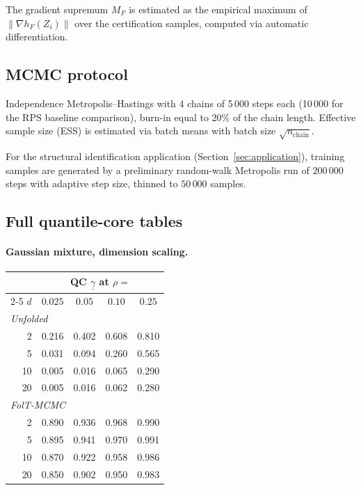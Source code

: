 The gradient supremum $M_F$ is estimated as the empirical maximum
of $\|\nabla h_F(Z_i)\|$ over the certification samples, computed
via automatic differentiation.

\subsection{MCMC protocol}
\label{app:mcmc_protocol}

Independence Metropolis--Hastings with 4 chains of 5\,000 steps
each (10\,000 for the RPS baseline comparison), burn-in equal to
$20\%$ of the chain length.  Effective sample size (ESS) is
estimated via batch means with batch size $\sqrt{n_{\mathrm{chain}}}$.

For the structural identification application
(Section~\ref{sec:application}), training samples are generated
by a preliminary random-walk Metropolis run of $200\,000$ steps
with adaptive step size, thinned to $50\,000$ samples.

\subsection{Full quantile-core tables}
\label{app:qc_tables}

\paragraph{Gaussian mixture, dimension scaling.}

\begin{center}
\begin{tabular}{rcccc}
\hline
& \multicolumn{4}{c}{QC $\underline{\gamma}$ at $\rho =$} \\
\cline{2-5}
$d$ & $0.025$ & $0.05$ & $0.10$ & $0.25$ \\
\hline
\multicolumn{5}{l}{\textit{Unfolded}} \\
2  & 0.216 & 0.402 & 0.608 & 0.810 \\
5  & 0.031 & 0.094 & 0.260 & 0.565 \\
10 & 0.005 & 0.016 & 0.065 & 0.290 \\
20 & 0.005 & 0.016 & 0.062 & 0.280 \\
\hline
\multicolumn{5}{l}{\textit{FolT-MCMC}} \\
2  & 0.890 & 0.936 & 0.968 & 0.990 \\
5  & 0.895 & 0.941 & 0.970 & 0.991 \\
10 & 0.870 & 0.922 & 0.958 & 0.986 \\
20 & 0.850 & 0.902 & 0.950 & 0.983 \\
\hline
\end{tabular}
\end{center}

